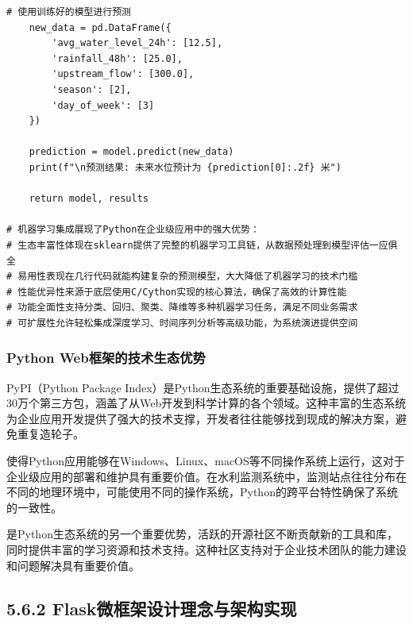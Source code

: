 \begin{lstlisting}[style=python]
    # 使用训练好的模型进行预测
    new_data = pd.DataFrame({
        'avg_water_level_24h': [12.5],
        'rainfall_48h': [25.0],
        'upstream_flow': [300.0],
        'season': [2],
        'day_of_week': [3]
    })
    
    prediction = model.predict(new_data)
    print(f"\n预测结果: 未来水位预计为 {prediction[0]:.2f} 米")
    
    return model, results

# 机器学习集成展现了Python在企业级应用中的强大优势：
# 生态丰富性体现在sklearn提供了完整的机器学习工具链，从数据预处理到模型评估一应俱全
# 易用性表现在几行代码就能构建复杂的预测模型，大大降低了机器学习的技术门槛
# 性能优异性来源于底层使用C/Cython实现的核心算法，确保了高效的计算性能
# 功能全面性支持分类、回归、聚类、降维等多种机器学习任务，满足不同业务需求
# 可扩展性允许轻松集成深度学习、时间序列分析等高级功能，为系统演进提供空间
\end{lstlisting}

\hypertarget{python-webux6846ux67b6ux7684ux6280ux672fux751fux6001ux4f18ux52bf}{%
\subsubsection{Python Web框架的技术生态优势}\label{python-webux6846ux67b6ux7684ux6280ux672fux751fux6001ux4f18ux52bf}}

PyPI（Python Package Index）是Python生态系统的重要基础设施，提供了超过30万个第三方包，涵盖了从Web开发到科学计算的各个领域。这种丰富的生态系统为企业应用开发提供了强大的技术支撑，开发者往往能够找到现成的解决方案，避免重复造轮子。

使得Python应用能够在Windows、Linux、macOS等不同操作系统上运行，这对于企业级应用的部署和维护具有重要价值。在水利监测系统中，监测站点往往分布在不同的地理环境中，可能使用不同的操作系统，Python的跨平台特性确保了系统的一致性。

是Python生态系统的另一个重要优势，活跃的开源社区不断贡献新的工具和库，同时提供丰富的学习资源和技术支持。这种社区支持对于企业技术团队的能力建设和问题解决具有重要价值。

\hypertarget{flaskux5faeux6846ux67b6ux8bbeux8ba1ux7406ux5ff5ux4e0eux67b6ux6784ux5b9eux73b0}{%
\subsection{5.6.2 Flask微框架设计理念与架构实现}\label{flaskux5faeux6846ux67b6ux8bbeux8ba1ux7406ux5ff5ux4e0eux67b6ux6784ux5b9eux73b0}}

